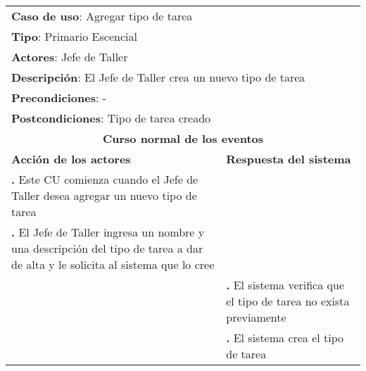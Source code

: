\documentclass[12pt]{extarticle}
\begin{document}
    \newcommand\inc{\stepcounter{step}\textbf{\thestep. }}
    \newcommand\resetinc{\setcounter{step}{0}}
    \newcommand\raya{\noindent\rule{169mm}{0.8mm}\\}


	\begin{longtable}{ |p{8cm}|p{8cm}| }
		\hline
		\multicolumn{2}{|p{16cm}|}{\textbf{Caso de uso}: Agregar tipo de tarea}\\
		\multicolumn{2}{|p{16cm}|}{\textbf{Tipo}: Primario Escencial}\\
		\multicolumn{2}{|p{16cm}|}{\textbf{Actores}: Jefe de Taller}\\
		\multicolumn{2}{|p{16cm}|}{\textbf{Descripción}: El Jefe de Taller crea un nuevo tipo de tarea}\\
		\multicolumn{2}{|p{16cm}|}{\textbf{Precondiciones}: -}\\
		\multicolumn{2}{|p{16cm}|}{\textbf{Postcondiciones}: Tipo de tarea creado}\\
		\hline
		\multicolumn{2}{|c|}{\textbf{Curso normal de los eventos}}\\
		\hline
		\textbf{Acción de los actores} & \textbf{Respuesta del sistema}\\
		\hline
			\inc Este CU comienza cuando el Jefe de Taller desea agregar un nuevo tipo de tarea & \\
			\hline
            \inc  El Jefe de Taller ingresa un nombre y una descripción del tipo de tarea a dar de alta y le solicita al sistema que lo cree & \\
			\hline
            & \inc El sistema verifica que el tipo de tarea no exista previamente \\
			\hline
			& \inc El sistema crea el tipo de tarea \\
			\hline



\end{longtable}
\end{document}
